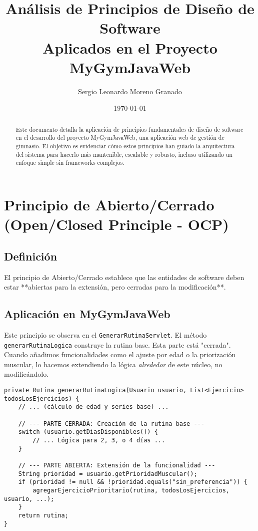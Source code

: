 \documentclass[11pt,a4paper]{article}
\begin{document}
\title{Análisis de Principios de Diseño de Software \\ \large Aplicados en el Proyecto MyGymJavaWeb}
\author{Sergio Leonardo Moreno Granado}
\date{\today}
\maketitle

\begin{abstract}
Este documento detalla la aplicación de principios fundamentales de diseño de software en el desarrollo del proyecto MyGymJavaWeb, una aplicación web de gestión de gimnasio. El objetivo es evidenciar cómo estos principios han guiado la arquitectura del sistema para hacerlo más mantenible, escalable y robusto, incluso utilizando un enfoque simple sin frameworks complejos.
\end{abstract}


\section{Principio de Abierto/Cerrado (Open/Closed Principle - OCP)}
\subsection{Definición}
El principio de Abierto/Cerrado establece que las entidades de software deben estar **abiertas para la extensión, pero cerradas para la modificación**.
\subsection{Aplicación en MyGymJavaWeb}
Este principio se observa en el \texttt{GenerarRutinaServlet}. El método \texttt{generarRutinaLogica} construye la rutina base. Esta parte está "cerrada". Cuando añadimos funcionalidades como el ajuste por edad o la priorización muscular, lo hacemos extendiendo la lógica \emph{alrededor} de este núcleo, no modificándolo.
\begin{lstlisting}[caption={Extensión de la lógica en \texttt{GenerarRutinaServlet.java}}]
private Rutina generarRutinaLogica(Usuario usuario, List<Ejercicio> todosLosEjercicios) {
    // ... (cálculo de edad y series base) ...

    // --- PARTE CERRADA: Creación de la rutina base ---
    switch (usuario.getDiasDisponibles()) {
        // ... Lógica para 2, 3, o 4 días ...
    }

    // --- PARTE ABIERTA: Extensión de la funcionalidad ---
    String prioridad = usuario.getPrioridadMuscular();
    if (prioridad != null && !prioridad.equals("sin_preferencia")) {
        agregarEjercicioPrioritario(rutina, todosLosEjercicios, usuario, ...);
    }
    return rutina;
}
\end{lstlisting}
\end{document}
